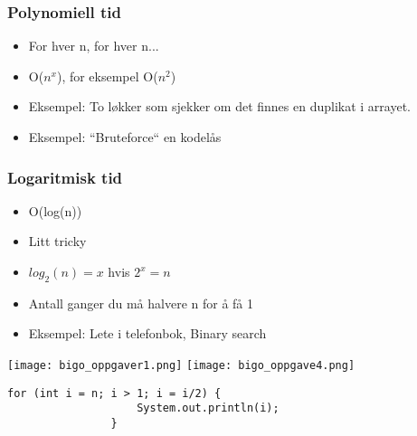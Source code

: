 \documentclass[norsk, handout]{beamer}
\begin{document}
    \begin{frame}
        \frametitle{Polynomiell tid}

        \begin{itemize}
            \item For hver n, for hver n...
            \item O($n^x$), for eksempel O($n^2$)
            \item Eksempel: To løkker som sjekker om det finnes en duplikat i arrayet.
            \item Eksempel: ``Bruteforce`` en kodelås
        \end{itemize}
    \end{frame}

    \begin{frame}
        \frametitle{Logaritmisk tid}

        \begin{itemize}
            \item O(log(n))
            \item Litt tricky
            \item $log_2(n) = x$ hvis $2^x = n$
            \item Antall ganger du må halvere n for å få 1
            \item Eksempel: Lete i telefonbok, Binary search
        \end{itemize}
    \end{frame}

    \begin{frame}[fragile]
        \begin{center}
            \texttt{[image: bigo\_oppgaver1.png]}
            \texttt{[image: bigo\_oppgave4.png]}

        \begin{lstlisting}[basicstyle=\scriptsize]
                for (int i = n; i > 1; i = i/2) {
                    System.out.println(i);
                }
		\end{lstlisting}
        \end{center}
    \end{frame}
\end{document}
